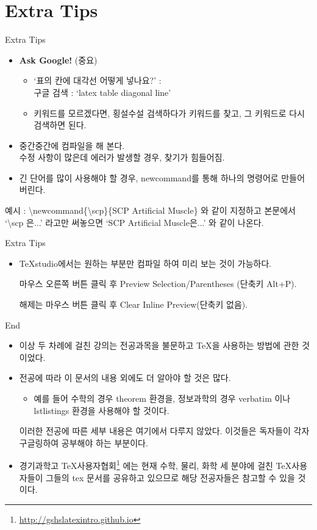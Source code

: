 \documentclass[12pt]{beamer}
\begin{document}
\section{Extra Tips}
\begin{frame}{Extra Tips}
	\begin{itemize}
		\item \textbf{Ask Google!} (중요)
		\begin{itemize}
			\item `표의 칸에 대각선 어떻게 넣나요?' : \\
			구글 검색 : `latex table diagonal line'
			\item 키워드를 모르겠다면, 횡설수설 검색하다가 키워드를 찾고, 그 키워드로 다시 검색하면 된다.
		\end{itemize}
		\item 중간중간에 컴파일을 해 본다. \\
		수정 사항이 많은데 에러가 발생할 경우, 찾기가 힘들어짐.
		\item 긴 단어를 많이 사용해야 할 경우, newcommand를 통해 하나의 명령어로 만들어 버린다.
	\end{itemize}
	\begin{footnotesize}
		예시 : \textbackslash newcommand\{\textbackslash scp\}\{SCP Artificial Muscle\} 와 같이 지정하고 본문에서 `\textbackslash scp 은...' 라고만 써놓으면 `SCP Artificial Muscle은...' 와 같이 나온다.
	\end{footnotesize}
\end{frame}
\begin{frame}{Extra Tips}
	\begin{itemize}
		\item TeXstudio에서는 원하는 부분만 컴파일 하여 미리 보는 것이 가능하다. 
		
		마우스 오른쪽 버튼 클릭 후 Preview Selection/Parentheses (단축키 Alt+P).
		
		해제는 마우스 버튼 클릭 후 Clear Inline Preview(단축키 없음).
	\end{itemize}
\end{frame}
\begin{frame}{End}
	\begin{itemize}
		\item 이상 두 차례에 걸친 강의는 전공과목을 불문하고 \TeX 을 사용하는 방법에 관한 것이었다.
		\item 전공에 따라 이 문서의 내용 외에도 더 알아야 할 것은 많다. 
		\begin{itemize}
			\item 예를 들어 수학의 경우 theorem 환경을, 정보과학의 경우 verbatim 이나 lstlistings 환경을 사용해야 할 것이다.
		\end{itemize}
		이러한 전공에 따른 세부 내용은 여기에서 다루지 않았다. 이것들은 독자들이 각자 구글링하여 공부해야 하는 부분이다.
		\item 경기과학고 \TeX 사용자협회\footnote{\url{http://gshslatexintro.github.io}}  에는 현재 수학, 물리, 화학 세 분야에 걸친 \TeX 사용자들이 그들의 tex 문서를 공유하고 있으므로 해당 전공자들은 참고할 수 있을 것이다.
	\end{itemize}
\end{frame}
\end{document}
